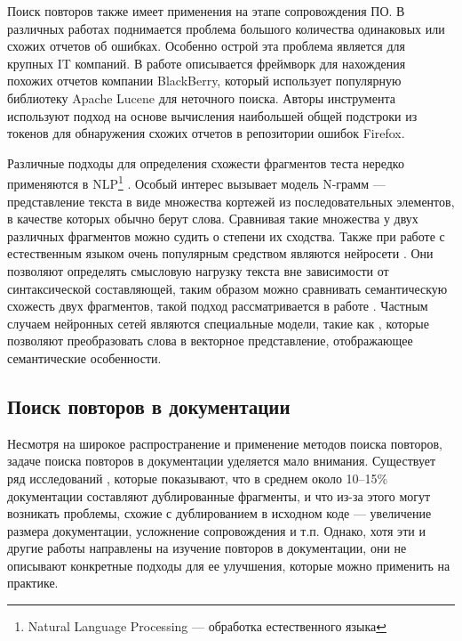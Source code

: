 \documentclass[14pt]{matmex-diploma-custom}
\begin{document}
Поиск повторов также имеет применения на этапе сопровождения ПО. В различных работах поднимается проблема большого количества одинаковых или схожих отчетов об ошибках. Особенно острой эта проблема является для крупных IT компаний. В работе \cite{bib:tool:DefectDetection} описывается фреймворк для нахождения похожих отчетов компании BlackBerry, который использует популярную библиотеку Apache Lucene \cite{bib:tool:Lucene} для неточного поиска. Авторы инструмента \cite{bib:tool:DuplicateBugs} используют подход на основе вычисления наибольшей общей подстроки из токенов \cite{bib:art:LCS} для обнаружения схожих отчетов в репозитории ошибок Firefox.

Различные подходы для определения схожести фрагментов теста нередко применяются в NLP\footnote{Natural Language Processing --- обработка естественного языка} \cite{bib:art:NLP}. Особый интерес вызывает модель N-грамм \cite{bib:art:Ngram} --- представление текста в виде множества кортежей из последовательных элементов, в качестве которых обычно берут слова. Сравнивая такие множества у двух различных фрагментов можно судить о степени их сходства. Также при работе с естественным языком очень популярным средством являются нейросети \cite{bib:art:NeuralNetworks}. Они позволяют определять смысловую нагрузку текста вне зависимости от синтаксической составляющей, таким образом можно сравнивать семантическую схожесть двух фрагментов, такой подход рассматривается в работе \cite{bib:tool:NeuroDupDetect}. Частным случаем нейронных сетей являются специальные модели, такие как \cite{bib:tool:word2vec}, которые позволяют преобразовать слова в векторное представление, отображающее семантические особенности.

\subsection{Поиск повторов в документации}

Несмотря на широкое распространение и применение методов поиска повторов, задаче поиска повторов в документации уделяется мало внимания. Существует ряд исследований \cite{bib:art:JuergensCloneDetect, bib:art:DuplicatesStudy}, которые показывают, что в среднем около 10--15\% документации составляют дублированные фрагменты, и что из-за этого могут возникать проблемы, схожие с дублированием в исходном коде --- увеличение размера документации, усложнение сопровождения и т.п. Однако, хотя эти и другие работы направлены на изучение повторов в документации, они не описывают конкретные подходы для ее улучшения, которые можно применить на практике.
\end{document}
